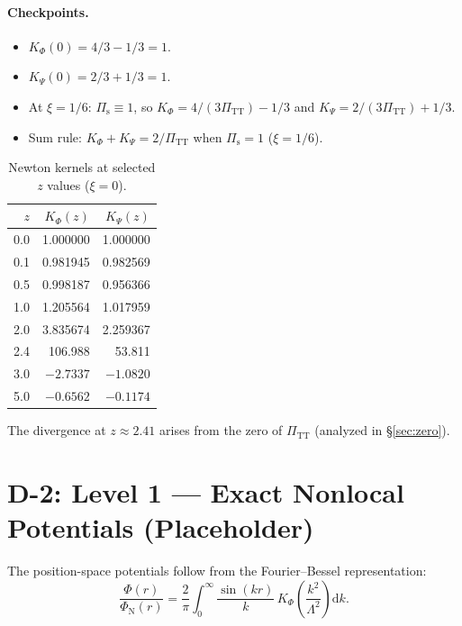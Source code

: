 \documentclass[11pt,a4paper]{article}
\newcommand{\dd}{\mathrm{d}}
\newcommand{\PiTT}{\Pi_{\mathrm{TT}}}
\newcommand{\Pis}{\Pi_{\mathrm{s}}}
\newcommand{\KPhi}{K_\Phi}
\newcommand{\KPsi}{K_\Psi}
\begin{document}
\paragraph{Checkpoints.}
\begin{itemize}
  \item $\KPhi(0) = 4/3 - 1/3 = 1$. \quad\textcolor{verified}{\checkmark}
  \item $\KPsi(0) = 2/3 + 1/3 = 1$. \quad\textcolor{verified}{\checkmark}
  \item At $\xi = 1/6$: $\Pis \equiv 1$, so
    $\KPhi = 4/(3\PiTT) - 1/3$ and $\KPsi = 2/(3\PiTT) + 1/3$.
  \item Sum rule: $\KPhi + \KPsi = 2/\PiTT$ when $\Pis = 1$ ($\xi = 1/6$).
    \quad\textcolor{verified}{\checkmark}
\end{itemize}

\begin{table}[h]
\centering
\caption{Newton kernels at selected $z$ values ($\xi = 0$).}
\label{tab:kernels}
\begin{tabular}{r r r}
\toprule
$z$ & $\KPhi(z)$ & $\KPsi(z)$ \\
\midrule
0.0  &  1.000000 &  1.000000 \\
0.1  &  0.981945 &  0.982569 \\
0.5  &  0.998187 &  0.956366 \\
1.0  &  1.205564 &  1.017959 \\
2.0  &  3.835674 &  2.259367 \\
2.4  & 106.988   & 53.811 \\
3.0  & $-2.7337$ & $-1.0820$ \\
5.0  & $-0.6562$ & $-0.1174$ \\
\bottomrule
\end{tabular}
\end{table}

The divergence at $z \approx 2.41$ arises from the zero of $\PiTT$
(analyzed in \S\ref{sec:zero}).


\section{D-2: Level 1 --- Exact Nonlocal Potentials (Placeholder)}
\label{sec:level1}

The position-space potentials follow from the Fourier--Bessel representation:
\begin{equation}\label{eq:fourier_bessel}
  \frac{\Phi(r)}{\Phi_{\mathrm{N}}(r)}
  = \frac{2}{\pi}\int_0^\infty \frac{\sin(kr)}{k}\,\KPhi\!\left(\frac{k^2}{\Lambda^2}\right) \dd k.
\end{equation}
\end{document}
